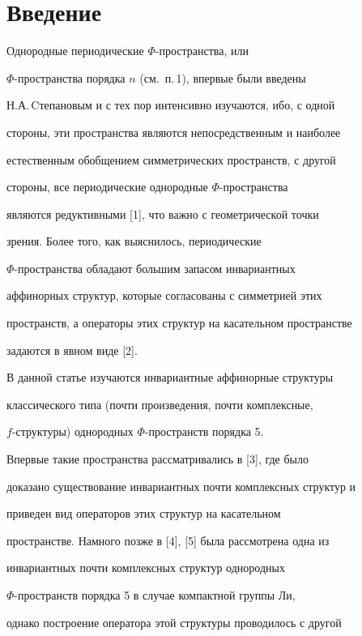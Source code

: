 \section*{Введение}





Однородные периодические $\Phi$-пространства, или


$\Phi$-пространства порядка $n$ (см.~п.\,1), впервые были введены


Н.А.\,Cтепановым и с тех пор интенсивно изучаются, ибо, с одной


стороны, эти пространства являются непосредственным и наиболее


естественным обобщением симметрических пространств, с другой


стороны, все периодические однородные $\Phi$-пространства


являются редуктивными [1], что важно с геометрической точки


зрения. Более того, как выяснилось, периодические


$\Phi$-пространства обладают большим запасом инвариантных


аффинорных структур, которые согласованы с симметрией этих


пространств, а операторы этих структур на касательном пространстве


задаются в явном виде [2].





В данной статье изучаются инвариантные аффинорные структуры


классического типа (почти произведения, почти комплексные,


$f$-структуры) однородных $\Phi$-пространств порядка 5.





Впервые такие пространства рассматривались в [3], где было


доказано существование инвариантных почти комплексных структур и


приведен вид операторов этих структур на касательном


пространстве. Намного позже в [4], [5] была рассмотрена одна из


инвариантных почти комплексных структур однородных


$\Phi$-пространств порядка 5 в случае компактной группы Ли,


однако построение оператора этой структуры проводилось с другой


